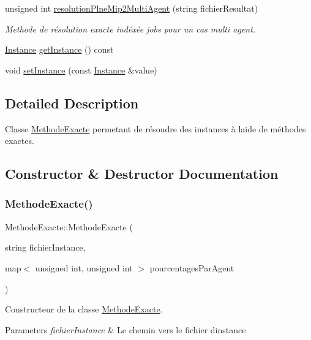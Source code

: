 \begin{DoxyCompactItemize}
unsigned int \hyperlink{classMethodeExacte_af5ed64d8d21ead081e02c3ac97192859}{resolution\+Plne\+Mip2\+Multi\+Agent} (string fichier\+Resultat)
\begin{DoxyCompactList}\small\item\em Methode de résolution exacte indéxée jobs pour un cas multi agent. \end{DoxyCompactList}\item 
\hyperlink{classInstance}{Instance} \hyperlink{classMethodeExacte_a6c8b291d40a0e9c3df51ea367d43189c}{get\+Instance} () const
\item 
void \hyperlink{classMethodeExacte_ae4a99972ce73ff50611a8842506723f9}{set\+Instance} (const \hyperlink{classInstance}{Instance} \&value)
\end{DoxyCompactItemize}


\subsection{Detailed Description}
Classe \hyperlink{classMethodeExacte}{Methode\+Exacte} permetant de résoudre des instances à l\textquotesingle{}aide de méthodes exactes. 

\subsection{Constructor \& Destructor Documentation}
\mbox{\label{classMethodeExacte_a82cea9720ff44a85f2c991f601ffd53b}} 
\subsubsection{\texorpdfstring{Methode\+Exacte()}{MethodeExacte()}}
{\footnotesize\ttfamily Methode\+Exacte\+::\+Methode\+Exacte (\begin{DoxyParamCaption}\item[{string}]{fichier\+Instance,  }\item[{map$<$ unsigned int, unsigned int $>$}]{pourcentages\+Par\+Agent }\end{DoxyParamCaption})}



Constructeur de la classe \hyperlink{classMethodeExacte}{Methode\+Exacte}. 


\begin{DoxyParams}{Parameters}
{\em fichier\+Instance} & Le chemin vers le fichier d\textquotesingle{}instance \\
\hline
\end{DoxyParams}


